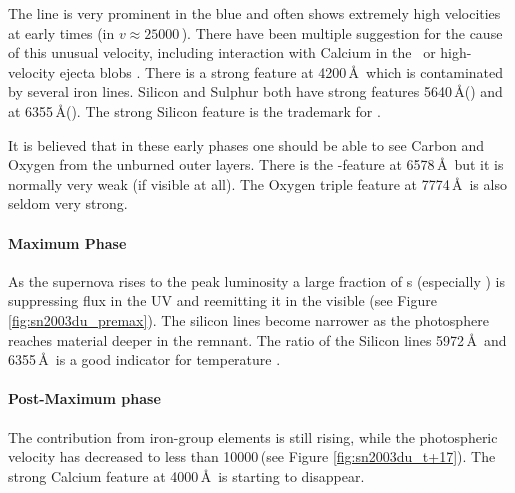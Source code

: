 The  line is very prominent in the blue and often shows extremely high velocities at early times (in  $v \approx 25000$\,\kms). There have been multiple suggestion for the cause of this unusual velocity, including interaction with Calcium in the \ism\ or high-velocity ejecta blobs \citep{1999ApJ...525..881H,2004ApJ...607..391G,2004ApJ...601.1019T,2005ApJ...623L..37M,2006ApJ...636..400Q,2006ApJ...645..470T,2007A&A...471..527G}.
There is a strong  feature at 4200\,\AA\ which is contaminated by several iron lines. Silicon and Sulphur both have strong features 5640\,\AA () and at 6355\,\AA (). The strong Silicon feature is the trademark for \sneia.

It is believed that in these early phases one should be able to see Carbon and Oxygen from the unburned outer layers. There is the -feature at 6578\,\AA\ but it is normally very weak (if visible at all). The Oxygen triple feature at 7774\,\AA\ is also seldom very strong.

\paragraph{Maximum Phase} As the supernova rises to the peak luminosity a large fraction of \ige s (especially \Ni) is suppressing flux in the UV and reemitting it in the visible (see Figure \ref{fig:sn2003du_premax}). The silicon lines become narrower as the photosphere reaches material deeper in the remnant. The ratio of the Silicon lines  5972\,\AA\ and  6355\,\AA\ is a good indicator for temperature \citep{1995ApJ...455L.147N}. 


\paragraph{Post-Maximum phase}
The contribution from iron-group elements is still rising, while the photospheric velocity has decreased to less than 10000\,\kms (see Figure \ref{fig:sn2003du_t+17}). The strong Calcium feature at 4000\,\AA\ is starting to disappear. 


